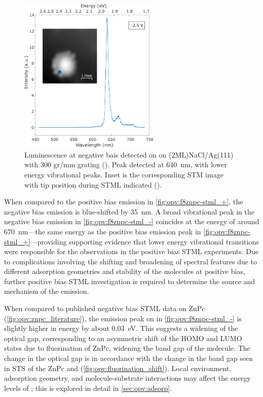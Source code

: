 \begin{figure} [H]
    \centering
           \includegraphics[width=0.6\textwidth]{pictures/f8znpc_-ve_emission_inset300.png}
        \caption{Luminescence at negative bais detected on  on (2ML)NaCl/Ag(111) with 300 gr/mm grating (). Peak detected at \SI{640}{nm}, with lower energy vibrational peaks. Inset is the corresponding STM image with tip position during STML indicated ().}
        \label{fig:opv:f8znpc-stml_-}
\end{figure}

When compared to the positive bias emission in \autoref{fig:opv:f8znpc-stml_+}, the negative bias emission is blue-shifted by \SI{35}{nm}. A broad vibrational peak in the negative bias emission in \autoref{fig:opv:f8znpc-stml_-} coincides at the energy of around \SI{670}{nm}---the same energy as the positive bias emission peak in \autoref{fig:opv:f8znpc-stml_+}---providing supporting evidence that lower energy vibrational transitions were responsible for the observations in the positive bias \ac{STML} experiments.  Due to complications involving the shifting and broadening of spectral features due to different adsorption geometries and stability of the molecules at positive bias, further positive bias \ac{STML} investigation is required to determine the source and mechanism of the emission.

When compared to published negative bias \ac{STML} data on \ac{ZnPc} (\autoref{fig:opv:znpc_literature}), the emission peak on  in \autoref{fig:opv:f8znpc-stml_-} is slightly higher in energy by about \SI{0.03}{eV}. This suggests a widening of the optical gap, corresponding to an asymmetric shift of the HOMO and LUMO states due to fluorination of ZnPc, widening the band gap of the molecule. The change in the optical gap is in accordance with the change in the band gap seen in \ac{STS} of the ZnPc and  (\autoref{fig:opv:fluorination_shift}).  Local environment, adsorption geometry, and molecule-substrate interactions may affect the energy levels of ; this is explored in detail in \autoref{sec:opv:adsorp}.

